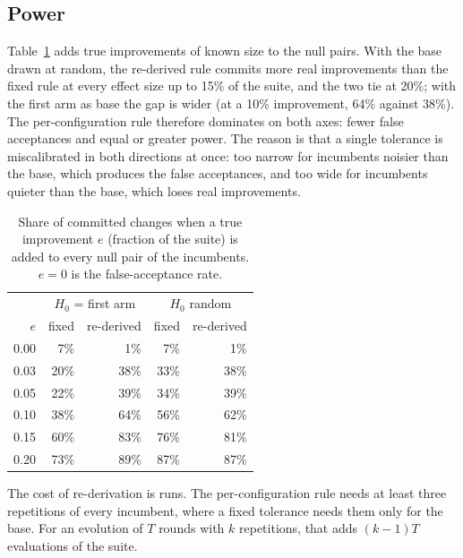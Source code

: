 \subsection{Power}\label{sec:res-power}
Table~\ref{tab:power} adds true improvements of known size to the null pairs.
With the base drawn at random, the re-derived rule commits more real improvements
than the fixed rule at every effect size up to 15\% of the suite, and the two tie
at 20\%; with the first arm as base the gap is wider (at a 10\% improvement, 64\%
against 38\%). The per-configuration rule therefore dominates on both axes:
fewer false acceptances and equal or greater power. The reason is that a single
tolerance is miscalibrated in both directions at once: too narrow for incumbents
noisier than the base, which produces the false acceptances, and too wide for
incumbents quieter than the base, which loses real improvements.

\begin{table}[t]
\centering
\caption{Share of committed changes when a true improvement $e$ (fraction of the
suite) is added to every null pair of the incumbents. $e = 0$ is the
false-acceptance rate.}\label{tab:power}
\begin{tabular}{rrrrr}
\toprule
 & \multicolumn{2}{c}{$H_0$ = first arm} & \multicolumn{2}{c}{$H_0$ random} \\
$e$ & fixed & re-derived & fixed & re-derived \\
\midrule
0.00 & 7\% & 1\% & 7\% & 1\% \\
0.03 & 20\% & 38\% & 33\% & 38\% \\
0.05 & 22\% & 39\% & 34\% & 39\% \\
0.10 & 38\% & 64\% & 56\% & 62\% \\
0.15 & 60\% & 83\% & 76\% & 81\% \\
0.20 & 73\% & 89\% & 87\% & 87\% \\
\bottomrule
\end{tabular}
\end{table}

The cost of re-derivation is runs. The per-configuration rule needs at least
three repetitions of every incumbent, where a fixed tolerance needs them only for
the base. For an evolution of $T$ rounds with $k$ repetitions, that adds $(k-1)T$
evaluations of the suite.

